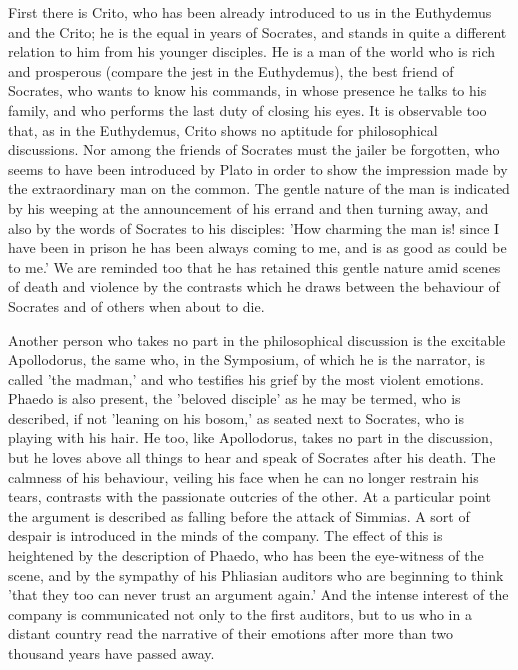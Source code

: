 \documentclass[11pt,letter]{article}
\begin{document}
\par  First there is Crito, who has been already introduced to us in the Euthydemus and the Crito; he is the equal in years of Socrates, and stands in quite a different relation to him from his younger disciples. He is a man of the world who is rich and prosperous (compare the jest in the Euthydemus), the best friend of Socrates, who wants to know his commands, in whose presence he talks to his family, and who performs the last duty of closing his eyes. It is observable too that, as in the Euthydemus, Crito shows no aptitude for philosophical discussions. Nor among the friends of Socrates must the jailer be forgotten, who seems to have been introduced by Plato in order to show the impression made by the extraordinary man on the common. The gentle nature of the man is indicated by his weeping at the announcement of his errand and then turning away, and also by the words of Socrates to his disciples: 'How charming the man is! since I have been in prison he has been always coming to me, and is as good as could be to me.' We are reminded too that he has retained this gentle nature amid scenes of death and violence by the contrasts which he draws between the behaviour of Socrates and of others when about to die.

\par  Another person who takes no part in the philosophical discussion is the excitable Apollodorus, the same who, in the Symposium, of which he is the narrator, is called 'the madman,' and who testifies his grief by the most violent emotions. Phaedo is also present, the 'beloved disciple' as he may be termed, who is described, if not 'leaning on his bosom,' as seated next to Socrates, who is playing with his hair. He too, like Apollodorus, takes no part in the discussion, but he loves above all things to hear and speak of Socrates after his death. The calmness of his behaviour, veiling his face when he can no longer restrain his tears, contrasts with the passionate outcries of the other. At a particular point the argument is described as falling before the attack of Simmias. A sort of despair is introduced in the minds of the company. The effect of this is heightened by the description of Phaedo, who has been the eye-witness of the scene, and by the sympathy of his Phliasian auditors who are beginning to think 'that they too can never trust an argument again.' And the intense interest of the company is communicated not only to the first auditors, but to us who in a distant country read the narrative of their emotions after more than two thousand years have passed away.
\end{document}
